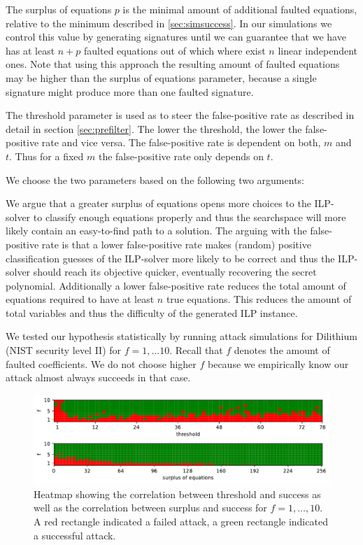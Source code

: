 The surplus of equations $p$ is the minimal amount of additional faulted equations, relative to the minimum described in  \ref{sec:simsuccess}.
In our simulations we control this value by generating signatures until we can guarantee that we have has at least $n + p$ faulted equations out of which where exist $n$ linear independent ones. Note that using this approach the resulting amount of faulted equations may be higher than the surplus of equations parameter, because a single signature might produce more than one faulted signature.

The threshold parameter is used as to steer the false-positive rate as described in detail in section \ref{sec:prefilter}. The lower the threshold, the lower the false-positive rate and vice versa.
The false-positive rate is dependent on both, $m$ and $t$. Thus for a fixed $m$ the false-positive rate only depends on $t$.

We choose the two parameters based on the following two arguments:

We argue that a greater surplus of equations opens more choices to the ILP-solver to classify enough equations properly and thus the searchspace will more likely contain an easy-to-find path to a solution.
The arguing with the false-positive rate is that a lower false-positive rate makes (random) positive classification guesses of the ILP-solver more likely to be correct and thus the ILP-solver should reach its objective quicker, eventually recovering the secret polynomial. Additionally a lower false-positive rate reduces the total amount of equations required to have at least $n$ true equations. This reduces the amount of total variables and thus the difficulty of the generated ILP instance.


We tested our hypothesis statistically by running attack simulations for Dilithium (NIST security level II) for $f = 1, \ldots 10$. Recall that $f$ denotes the amount of faulted coefficients. We do not choose higher $f$ because we empirically know our attack almost always succeeds in that case.



\begin{figure}%
		\centering%
		\includegraphics[width=.95\linewidth]{plots/threshold_pccolormesh}%
	\caption{Heatmap showing the correlation between threshold and success as well as the correlation between surplus and success for $f = 1, \ldots,10$. A red rectangle indicated a failed attack, a green rectangle indicated a successful attack.}
	\label{fig:heatmap}%
\end{figure}

